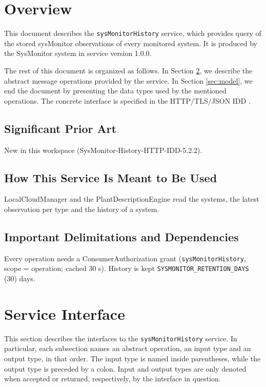 \documentclass[a4paper]{arrowhead}
\begin{document}
\section{Overview}
\label{sec:overview}

This document describes the \texttt{sysMonitorHistory} service, which provides query of the stored sysMonitor observations of every monitored system.
It is produced by the SysMonitor system \cite{smo-sysd} in service version 1.0.0.

The rest of this document is organized as follows.
In Section \ref{sec:operations}, we describe the abstract message operations provided by the service.
In Section \ref{sec:model}, we end the document by presenting the data types used by the mentioned operations.
The concrete interface is specified in the HTTP/TLS/JSON IDD \cite{smo-sysMonitorHistory-http-idd}.

\subsection{Significant Prior Art}

New in this workspace (SysMonitor-History-HTTP-IDD-5.2.2).

\subsection{How This Service Is Meant to Be Used}

LocalCloudManager and the Plant\allowbreak{}Description\allowbreak{}Engine read the systems, the latest observation per type and the history of a system.

\subsection{Important Delimitations and Dependencies}
\label{sec:delimitations}

Every operation needs a Consumer\allowbreak{}Authorization grant (\texttt{sysMonitorHistory}, scope = operation; cached 30 s). History is kept \texttt{SYSMONITOR\_\allowbreak{}RETENTION\_\allowbreak{}DAYS} (30) days.

\newpage

\section{Service Interface}
\label{sec:operations}

This section describes the interfaces to the \texttt{sysMonitorHistory} service.
In particular, each subsection names an abstract operation, an input type and an output type, in that order.
The input type is named inside parentheses, while the output type is preceded by a colon.
Input and output types are only denoted when accepted or returned, respectively, by the interface in question.
\end{document}
